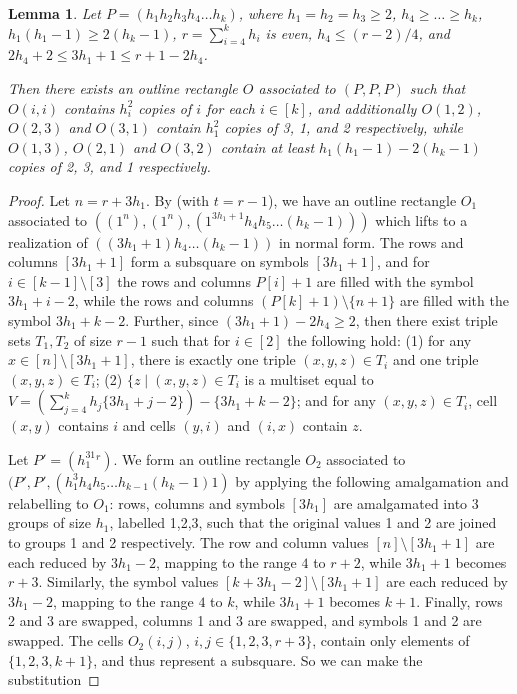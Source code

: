 \documentclass{sn-jnl}
\newtheorem{lemma}[theorem]{Lemma}
\theoremstyle{definition}
\begin{document}
\begin{lemma}
\label{even_r_from_circulant}
    Let $P=(h_1h_2h_3h_4\dots h_k)$, where $h_1=h_2=h_3\ge 2$, $h_4 \ge \dots \ge h_k$, $h_1(h_1-1)\geq 2(h_k-1)$, $r=\sum_{i=4}^k h_i$ is even, $h_4 \le (r-2)/4$, and 
    $2h_4+2 \le 3h_1+1 \le r+1-2h_4$.
    
    Then there exists an outline rectangle $O$ associated to $(P,P,P)$ such that $O(i,i)$ contains $h_i^2$ copies of $i$ for each $i\in [k]$, and additionally $O(1,2)$, $O(2,3)$ and $O(3,1)$ contain $h_1^2$ copies of 3, 1, and 2 respectively, while 
    $O(1,3)$, $O(2,1)$ and $O(3,2)$ contain at least $h_1(h_1-1)-2(h_k-1)$ copies of 2, 3, and 1 respectively.

\end{lemma}
\begin{proof}
    Let $n=r+3h_1$.
By  (with $t=r-1$), we have an outline rectangle $O_1$ associated to $((1^n), (1^n), (1^{3h_1+1}h_4h_5\dots (h_k-1)))$ which lifts to a realization of $((3h_1+1)h_4\dots (h_k-1))$ in normal form. The rows and columns $[3h_1+1]$ form a subsquare on symbols $[3h_1+1]$, and for $i\in [k-1] \setminus [3]$ the rows and columns $P[i]+1$ are filled with the symbol $3h_1+i-2$, while the rows and columns $(P[k]+1)\setminus \{n+1\}$ are filled with the symbol $3h_1+k-2$.
Further, since $(3h_1+1)-2h_4 \ge 2$, then there exist triple sets $T_1, T_2$ of size $r-1$ such that for $i\in [2]$ the following hold: (1) for any $x\in [n]\setminus [3h_1+1]$, there is exactly one triple $(x,y,z) \in T_i$ and one triple $(x,y,z) \in T_i$; (2) $\{z \mid (x,y,z) \in T_i$ is a multiset equal to $V= \left(\sum_{j=4}^{k} h_j \{3h_1+j-2\}\right)-\{3h_1+k-2\}$; and for any $(x,y,z) \in T_i$, cell $(x,y)$ contains $i$ and cells $(y,i)$ and $(i,x)$ contain $z$. 

    Let $P' = (h_1^31^r)$. We form an outline rectangle $O_2$ associated to $(P',P',(h_1^3 h_4h_5\dots h_{k-1}(h_k-1)1)$ by applying the following amalgamation and relabelling to $O_1$: rows, columns and symbols $[3h_1]$ are amalgamated into 3 groups of size $h_1$, labelled 1,2,3, such that the original values 1 and 2 are joined to groups 1 and 2 respectively. The row and column values $[n] \setminus [3h_1+1]$ are each reduced by $3h_1-2$, mapping to the range $4$ to $r+2$, while $3h_1+1$ becomes $r+3$. Similarly, the symbol values $[k+3h_1-2] \setminus [3h_1+1]$ are each reduced by $3h_1-2$, mapping to the range $4$ to $k$, while $3h_1+1$ becomes $k+1$.
    Finally, rows 2 and 3 are swapped, columns 1 and 3 are swapped, and symbols 1 and 2 are swapped. 
    The cells $O_2(i,j)$, $i,j \in \{1,2,3,r+3\}$, contain only elements of $\{1,2,3,k+1\}$, and thus represent a subsquare. So we can make the substitution 
\newline


\end{proof}
\end{document}
